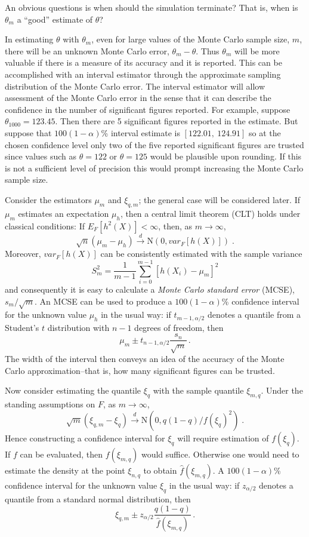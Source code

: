 \documentclass[12pt]{article}
\theoremstyle{plain}
\theoremstyle{definition}
\theoremstyle{remark}
\begin{document}
An obvious questions is when should the simulation terminate?  That
is, when is $\theta_m$ a ``good'' estimate of $\theta$?

In estimating $\theta$ with $\theta_m$, even for large values of the
Monte Carlo sample size, $m$, there will be an unknown Monte Carlo
error, $\theta_{m} - \theta$. Thus $\theta_{m}$ will be more valuable
if there is a measure of its accuracy and it is reported.  This can be
accomplished with an interval estimator  through the approximate sampling distribution of the Monte Carlo error. The interval estimator will
allow assessment of the Monte Carlo error in the sense that it can
describe the confidence in the number of significant figures reported.
For example, suppose $\theta_{1000}=123.45$.  Then there are 5
significant figures reported in the estimate. But suppose that
$100(1-\alpha)$\% interval estimate is $[122.01,~124.91]$ so at the
chosen confidence level only two of the five reported
significant figures are trusted since values such as $\theta=122$ or $\theta=125$
would be plausible upon rounding.  If this is not a sufficient level
of precision this would prompt increasing the Monte Carlo sample
size.

Consider the estimators $\mu_m$ and $\xi_{q,m}$; the general case will
be considered later. If $\mu_m$ estimates
an expectation $\mu_h$, then a central limit theorem (CLT) holds under
classical conditions: If $E_{F} [h^{2}(X)] < \infty$, then, as $m \to
\infty$,
\begin{equation}
\label{gofmc:eq:iid clt}
\sqrt{n}(\mu_{m} - \mu_{h}) \stackrel{d}{\to} \text{N}(0,var_{F}[h(X)])
\; .
\end{equation}
Moreover, $var_{F}[h(X)]$ can be consistently estimated with the sample
variance
\[
S_{m}^{2} = \frac{1}{m-1} \sum_{i=0}^{m-1} [ h(X_{i}) - \mu_{m}]^{2}
\] 
and consequently it is easy to calculate a \textit{Monte Carlo
  standard error} (MCSE), $s_{m} / \sqrt{m}$.  An MCSE can be used to
produce a $100(1-\alpha)$\% confidence interval for the unknown value
$\mu_{h}$ in the usual way: if $t_{m-1, \alpha/2}$ denotes a quantile
from a Student's $t$ distribution with $n-1$ degrees of freedom, then
\[
\mu_{m} \pm t_{n-1, \alpha/2} \frac{s_{n}}{\sqrt{m}}\, .
\]
The width of the interval then conveys an idea of the accuracy of the
Monte Carlo approximation--that is, how many significant figures can
be trusted.

Now consider estimating the quantile $\xi_{q}$ with the sample
quantile $\xi_{m,q}$.  Under the standing assumptions on $F$, as
$m \to \infty$,
\[
\sqrt{m}( \xi_{q,m} - \xi_{q}) \stackrel{d}{\to} \text{N}(0,
q(1-q)/f(\xi_{q})^{2}) \; . 
\]
Hence constructing a confidence interval for $\xi_{q}$ will require
estimation of $f(\xi_{q})$.  If $f$ can be evaluated, then $f(\xi_{m,
  q})$ would suffice.  Otherwise one would need to estimate the density
at the  point  $\xi_{n, q}$ to obtain $\hat{f}(\xi_{m, q})$.  A 
 $100(1-\alpha)$\% confidence interval for the unknown value
$\xi_q$ in the usual way: if $z_{\alpha/2}$ denotes a quantile
from a standard normal distribution, then
\[
\xi_{q,m} \pm z_{\alpha/2} \frac{q(1-q)}{\hat{f}(\xi_{m, q})}\, .
\]
\end{document}
